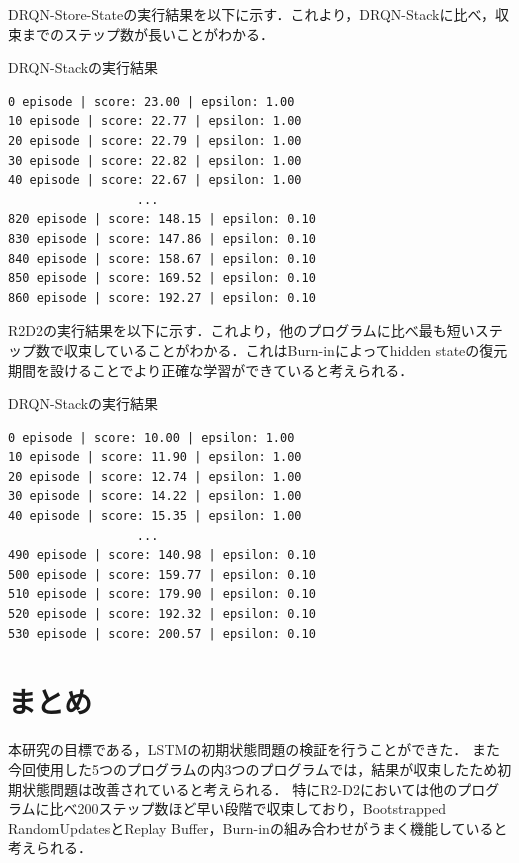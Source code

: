 \documentclass{eithesis}
\begin{document}
  DRQN-Store-Stateの実行結果を以下に示す．これより，DRQN-Stackに比べ，収束までのステップ数が長いことがわかる．
  \begin{breakitembox}[l]{DRQN-Stackの実行結果}
    \begin{verbatim}
0 episode | score: 23.00 | epsilon: 1.00
10 episode | score: 22.77 | epsilon: 1.00
20 episode | score: 22.79 | epsilon: 1.00
30 episode | score: 22.82 | epsilon: 1.00
40 episode | score: 22.67 | epsilon: 1.00
                  ...
820 episode | score: 148.15 | epsilon: 0.10
830 episode | score: 147.86 | epsilon: 0.10
840 episode | score: 158.67 | epsilon: 0.10
850 episode | score: 169.52 | epsilon: 0.10
860 episode | score: 192.27 | epsilon: 0.10
    \end{verbatim}
  \end{breakitembox}

  R2D2の実行結果を以下に示す．これより，他のプログラムに比べ最も短いステップ数で収束していることがわかる．これはBurn-inによってhidden stateの復元期間を設けることでより正確な学習ができていると考えられる．
  \begin{breakitembox}[l]{DRQN-Stackの実行結果}
    \begin{verbatim}
0 episode | score: 10.00 | epsilon: 1.00
10 episode | score: 11.90 | epsilon: 1.00
20 episode | score: 12.74 | epsilon: 1.00
30 episode | score: 14.22 | epsilon: 1.00
40 episode | score: 15.35 | epsilon: 1.00
                  ...
490 episode | score: 140.98 | epsilon: 0.10
500 episode | score: 159.77 | epsilon: 0.10
510 episode | score: 179.90 | epsilon: 0.10
520 episode | score: 192.32 | epsilon: 0.10
530 episode | score: 200.57 | epsilon: 0.10
    \end{verbatim}
  \end{breakitembox}

\chapter{まとめ}
  本研究の目標である，LSTMの初期状態問題の検証を行うことができた．
  また今回使用した5つのプログラムの内3つのプログラムでは，結果が収束したため初期状態問題は改善されていると考えられる．
  特にR2-D2においては他のプログラムに比べ200ステップ数ほど早い段階で収束しており，Bootstrapped RandomUpdatesとReplay Buffer，Burn-inの組み合わせがうまく機能していると考えられる．
\end{document}
